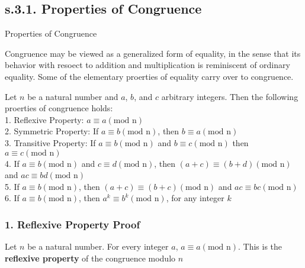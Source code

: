 \newpage
\subsection{s.3.1. Properties of Congruence}
\begin{definition}
Properties of Congruence

Congruence may be viewed as a generalized form of equality, in the sense that its behavior with resoect to addition and multiplication is reminiscent of ordinary equality. Some of the elementary proerties of equality carry over to congruence. 

\begin{tcolorbox}
	\begin{theorem}
		Let $n$ be a natural number and $a$, $b$, and $c$ arbitrary integers. Then the following proerties of congruence holds: \\
		1. Reflexive Property: $a \equiv a (\text{mod n})$ \\
		2. Symmetric Property: If $a \equiv b (\text{mod n})$, then $b \equiv a (\text{mod n})$ \\
		3. Transitive Property: If $a \equiv b (\text{mod n})$ and $b \equiv c (\text{mod n})$ then $a \equiv c (\text{mod n})$ \\
		4. If $a \equiv b (\text{mod n})$ and $c \equiv d (\text{mod n})$, then $(a + c) \equiv (b + d) (\text{mod n})$ and $ac \equiv bd (\text{mod n})$ \\
		5. If $a \equiv b (\text{mod n})$, then $(a + c) \equiv (b + c) (\text{mod n})$ and $ac \equiv bc (\text{mod n})$ \\
		6. If $a \equiv b (\text{mod n})$, then $a^k \equiv b^k (\text{mod n})$, for any integer $k$ \\
		
	\end{theorem}
\end{tcolorbox}













\subsubsection*{1. Reflexive Property Proof}
Let $n$ be a natural number. For every integer $a$, $a \equiv a (\text{mod n})$. This is the {\bf reflexive  property} of the congruence modulo $n$


\end{definition}
